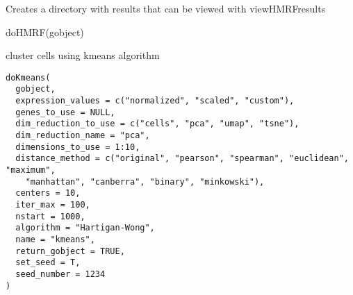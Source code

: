 \documentclass[a4paper]{book}
\begin{document}
%
\begin{Value}
Creates a directory with results that can be viewed with viewHMRFresults
\end{Value}
%
\begin{Examples}
\begin{ExampleCode}
    doHMRF(gobject)
\end{ExampleCode}
\end{Examples}
%
\begin{Description}\relax
cluster cells using kmeans algorithm
\end{Description}
%
\begin{Usage}
\begin{verbatim}
doKmeans(
  gobject,
  expression_values = c("normalized", "scaled", "custom"),
  genes_to_use = NULL,
  dim_reduction_to_use = c("cells", "pca", "umap", "tsne"),
  dim_reduction_name = "pca",
  dimensions_to_use = 1:10,
  distance_method = c("original", "pearson", "spearman", "euclidean", "maximum",
    "manhattan", "canberra", "binary", "minkowski"),
  centers = 10,
  iter_max = 100,
  nstart = 1000,
  algorithm = "Hartigan-Wong",
  name = "kmeans",
  return_gobject = TRUE,
  set_seed = T,
  seed_number = 1234
)
\end{verbatim}
\end{Usage}
%
\end{document}
